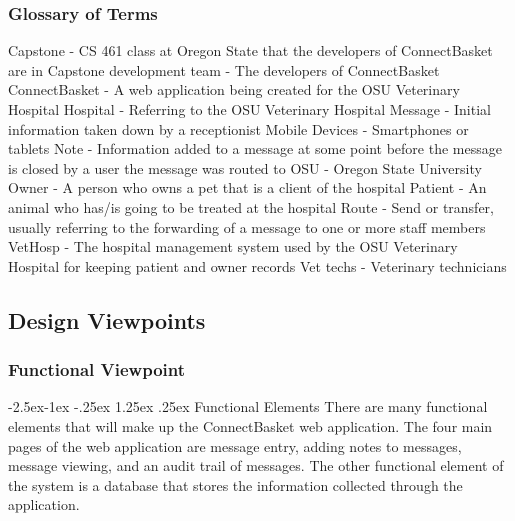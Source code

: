 \documentclass[onecolumn, draftclsnofoot,10pt, compsoc]{IEEEtran}
\makeatletter
\renewcommand\paragraph{\@startsection{paragraph}{4}{\z@}%
            {-2.5ex\@plus -1ex \@minus -.25ex}%
            {1.25ex \@plus .25ex}%
            {\normalfont\normalsize\bfseries}}
\makeatother
\begin{document}
\subsubsection{Glossary of Terms}
Capstone - CS 461 class at Oregon State that the developers of ConnectBasket are in \newline
Capstone development team - The developers of ConnectBasket\newline
ConnectBasket - A web application being created for the OSU Veterinary Hospital\newline
Hospital - Referring to the OSU Veterinary Hospital\newline
Message - Initial information taken down by a receptionist\newline
Mobile Devices - Smartphones or tablets\newline
Note - Information added to a message at some point before the message is closed by a user the message was routed to\newline
OSU - Oregon State University\newline
Owner - A person who owns a pet that is a client of the hospital\newline
Patient - An animal who has/is going to be treated at the hospital \newline
Route - Send or transfer, usually referring to the forwarding of a message to one or more staff members\newline
VetHosp - The hospital management system used by the OSU Veterinary Hospital for keeping patient and owner records\newline
Vet techs - Veterinary technicians

\subsection{Design Viewpoints}

\subsubsection{Functional Viewpoint}

\paragraph{Functional Elements}
There are many functional elements that will make up the ConnectBasket web application. The four main pages of the web application are message entry, adding notes to messages, message viewing, and an audit trail of messages. The other functional element of the system is a database that stores the information collected through the application.
\end{document}
